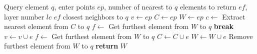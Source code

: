 \begin{algorithm}[H]
\caption{SEARCH-LAYER($q$, $ep$, $ef$, $lc$)}
\begin{algorithmic}[1]
\Require Query element $q$, enter points $ep$, number of nearest to $q$ elements to return $ef$, layer number $lc$
\Ensure $ef$ closest neighbors to $q$
\State $v \gets ep$ 
\State $C \gets ep$ 
\State $W \gets ep$ 
    \State $c \gets$ Extract nearest element from $C$ to $q$
    \State $f \gets$ Get furthest element from $W$ to $q$
        \State \textbf{break} 
    \EndIf
     
            \State $v \gets v \cup e$
            \State $f \gets$ Get furthest element from $W$ to $q$
                \State $C \gets C \cup e$
                \State $W \gets W \cup e$
                    \State Remove furthest element from $W$ to $q$
                \EndIf
            \EndIf
        \EndIf
    \EndFor
\EndWhile
\State \textbf{return} $W$
\end{algorithmic}
\end{algorithm}